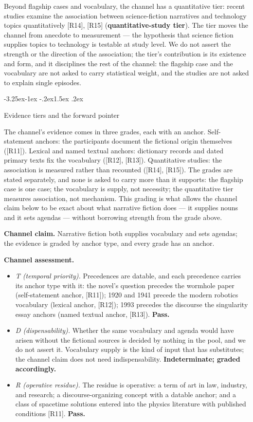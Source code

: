 \documentclass[11pt,a4paper]{article}
\makeatletter
\renewcommand\subsection{\@startsection{subsection}{2}{\z@}%
  {-3.25ex\@plus -1ex \@minus -.2ex}{1.5ex \@plus .2ex}%
  {\normalfont\large\bfseries\raggedright}}
\makeatother
\begin{document}
Beyond flagship cases and vocabulary, the channel has a quantitative tier: recent studies examine the association between science-fiction narratives and technology topics quantitatively [R14], [R15] (\textbf{quantitative-study tier}). The tier moves the channel from anecdote to measurement — the hypothesis that science fiction supplies topics to technology is testable at study level. We do not assert the strength or the direction of the association; the tier's contribution is its existence and form, and it disciplines the rest of the channel: the flagship case and the vocabulary are not asked to carry statistical weight, and the studies are not asked to explain single episodes.

\subsection{Evidence tiers and the forward pointer}

The channel's evidence comes in three grades, each with an anchor. Self-statement anchors: the participants document the fictional origin themselves ([R11]). Lexical and named textual anchors: dictionary records and dated primary texts fix the vocabulary ([R12], [R13]). Quantitative studies: the association is measured rather than recounted ([R14], [R15]). The grades are stated separately, and none is asked to carry more than it supports: the flagship case is one case; the vocabulary is supply, not necessity; the quantitative tier measures association, not mechanism. This grading is what allows the channel claim below to be exact about what narrative fiction does — it supplies nouns and it sets agendas — without borrowing strength from the grade above.

\textbf{Channel claim.} Narrative fiction both supplies vocabulary and sets agendas; the evidence is graded by anchor type, and every grade has an anchor.

\textbf{Channel assessment.}

\begin{itemize}[leftmargin=1.6em,itemsep=2pt,parsep=0pt,topsep=3pt]
\item \textit{T (temporal priority).} Precedences are datable, and each precedence carries its anchor type with it: the novel's question precedes the wormhole paper (self-statement anchor, [R11]); 1920 and 1941 precede the modern robotics vocabulary (lexical anchor, [R12]); 1993 precedes the discourse the singularity essay anchors (named textual anchor, [R13]). \textbf{Pass.}
\item \textit{D (dispensability).} Whether the same vocabulary and agenda would have arisen without the fictional sources is decided by nothing in the pool, and we do not assert it. Vocabulary supply is the kind of input that has substitutes; the channel claim does not need indispensability. \textbf{Indeterminate; graded accordingly.}
\item \textit{R (operative residue).} The residue is operative: a term of art in law, industry, and research; a discourse-organizing concept with a datable anchor; and a class of spacetime solutions entered into the physics literature with published conditions [R11]. \textbf{Pass.}
\end{itemize}
\end{document}
